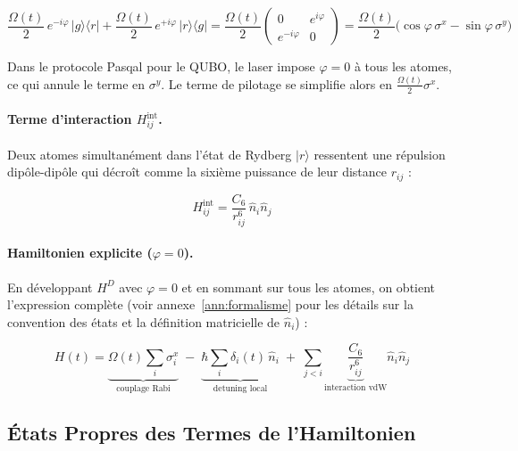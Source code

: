 \documentclass{ceri/sty/rapport}
\begin{document}
\begin{equation}
\frac{\Omega(t)}{2}\,e^{-i\varphi}\,|g\rangle\langle r|
+ \frac{\Omega(t)}{2}\,e^{+i\varphi}\,|r\rangle\langle g|
= \frac{\Omega(t)}{2}
\begin{pmatrix} 0 & e^{i\varphi} \\ e^{-i\varphi} & 0 \end{pmatrix}
= \frac{\Omega(t)}{2}\big(\cos\varphi\,\sigma^x - \sin\varphi\,\sigma^y\big)
\end{equation}

Dans le protocole Pasqal pour le QUBO, le laser impose $\varphi = 0$ à tous les atomes,
ce qui annule le terme en $\sigma^y$. Le terme de pilotage se simplifie alors en
$\frac{\Omega(t)}{2}\sigma^x$.

\paragraph{Terme d'interaction $H_{ij}^{\mathrm{int}}$.}
Deux atomes simultanément dans l'état de Rydberg $|r\rangle$ ressentent une répulsion
dipôle-dipôle qui décroît comme la sixième puissance de leur distance $r_{ij}$ :

\begin{equation}
H_{ij}^{\mathrm{int}} = \frac{C_6}{r_{ij}^6}\,\hat{n}_i\hat{n}_j
\end{equation}

\paragraph{Hamiltonien explicite ($\varphi = 0$).}
En développant $H^D$ avec $\varphi = 0$ et en sommant sur tous les atomes, on obtient
l'expression complète (voir annexe~\ref{ann:formalisme} pour les détails sur la convention
des états et la définition matricielle de $\hat{n}_i$) :

\begin{equation}
H(t) = \underbrace{\Omega(t)\sum_i \sigma_i^x}_{\text{couplage Rabi}}
\;-\; \underbrace{\hbar \sum_i \delta_i(t)\,\hat{n}_i}_{\text{detuning local}}
\;+\; \sum_{j<i} \underbrace{\frac{C_6}{r_{ij}^6}}_{\text{interaction vdW}} \hat{n}_i \hat{n}_j
\end{equation}

\subsection{États Propres des Termes de l'Hamiltonien}
\label{sec:etats-propres}
\end{document}

